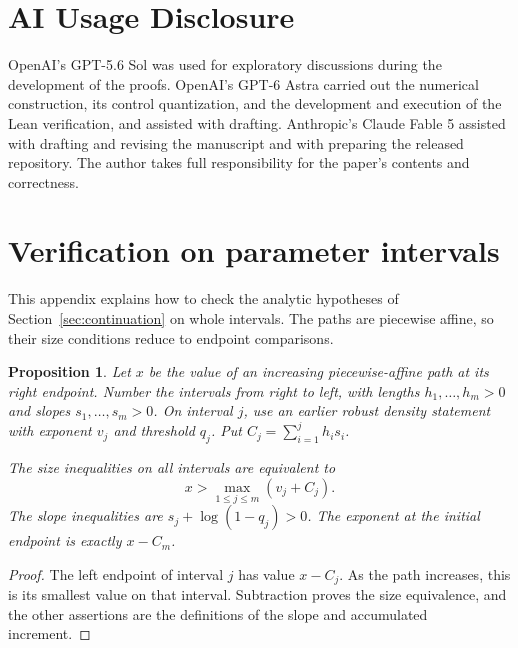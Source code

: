 \documentclass[11pt]{article}
\newtheorem{proposition}[theorem]{Proposition}
\theoremstyle{definition}
\theoremstyle{remark}
\numberwithin{equation}{section}
\begin{document}
\section*{AI Usage Disclosure}
OpenAI's GPT-5.6 Sol was used for exploratory discussions during the
development of the proofs. OpenAI's GPT-6 Astra carried out the
numerical construction, its control quantization, and the development
and execution of the Lean verification, and assisted with
drafting. Anthropic's Claude Fable 5 assisted with drafting and
revising the manuscript and with preparing the released repository.
The author takes full responsibility for the paper's contents and
correctness.

\appendix
\section{Verification on parameter intervals}\label{app:continuum}

This appendix explains how to check the analytic hypotheses of Section~\ref{sec:continuation} on whole intervals. The paths are piecewise affine, so their size conditions reduce to endpoint comparisons.

\begin{proposition}\label{prop:affine-checks}
Let $x$ be the value of an increasing piecewise-affine path at its
right endpoint. Number the intervals from right to left, with lengths
$h_1,\ldots,h_m>0$ and slopes $s_1,\ldots,s_m>0$.
On interval $j$, use an earlier robust density statement with exponent
$v_j$ and threshold $q_j$. Put $C_j=\sum_{i=1}^j h_i s_i$.

The size inequalities on all intervals are equivalent to
\[
 x>\max_{1\le j\le m}(v_j+C_j).
\]
The slope inequalities are $s_j+\log(1-q_j)>0$. The exponent at the initial endpoint is exactly $x-C_m$.
\end{proposition}
\begin{proof}
The left endpoint of interval $j$ has value $x-C_j$. As the path increases, this is its smallest value on that interval. Subtraction proves the size equivalence, and the other assertions are the definitions of the slope and accumulated increment.
\end{proof}
\end{document}
